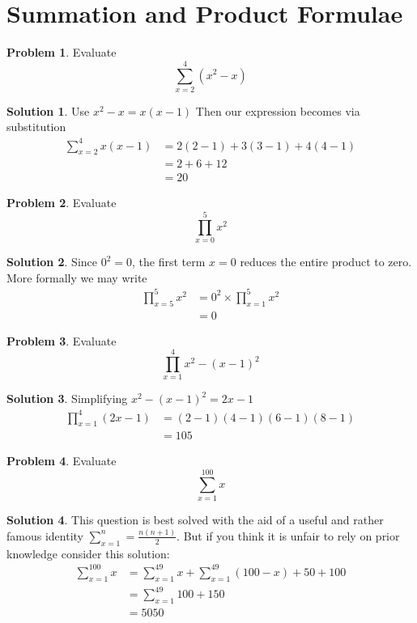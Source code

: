 \documentclass[a4paper]{article}
\theoremstyle{definition}
\newtheorem{problem}{Problem}[section]
\newtheorem*{solution}{Solution}
\begin{document}
\newpage
\section{Summation and Product Formulae}
\begin{problem}
Evaluate
\[
\sum_{x=2}^4 (x^2-x)
\]
\end{problem}
\begin{solution}
Use \(x^2 -x = x(x-1)\)
Then our expression becomes via substitution
\begin{align*}
\sum_{x=2}^4 x(x-1) &= 2(2-1) + 3(3-1) + 4(4-1) \\
&= 2 + 6 + 12 \\
&=20
\end{align*}
\end{solution}

\begin{problem}
Evaluate
\[
\prod_{x=0}^5 x^2
\]
\end{problem}
\begin{solution}
Since \(0^2 = 0\), the first term \(x = 0\) reduces the entire product to zero. More formally we may write
\begin{align*}
\prod_{x=5}^5 x^2 &= 0^2 \times \prod_{x=1}^5x^2 \\ 
&= 0
\end{align*}
\end{solution}

\begin{problem}
Evaluate
\[
\prod_{x=1}^{4}x^2-(x-1)^2
\]
\end{problem}
\begin{solution}
Simplifying \(x^2 - (x-1)^2 = 2x -1\)
\begin{align*}
\prod_{x=1}^4 (2x-1) &= (2-1)(4-1)(6-1)(8-1) \\
&=105
\end{align*}
\end{solution}

\begin{problem}
Evaluate
\[
\sum_{x=1}^{100} x
\]
\end{problem}
\begin{solution}
This question is best solved with the aid of a useful and rather famous identity \(\sum_{x=1}^n = \frac{n(n+1)}{2}\). But if you think it is unfair to rely on prior knowledge consider this solution:
\begin{align*}
\sum_{x=1}^{100}x &= \sum_{x=1}^{49}x + \sum_{x=1}^{49}(100-x) + 50 + 100 \\
&= \sum_{x=1}^{49}100 + 150 \\
&= 5050
\end{align*}
\end{solution}
\end{document}
